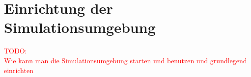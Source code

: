 


%















\section{Einrichtung der Simulationsumgebung}\label{appendix1:Einrichtung_der_Simulationsumgebung}
\textcolor{red}{TODO:\\
Wie kann man die Simulationsumgebung starten und benutzen und grundlegend einrichten
}
